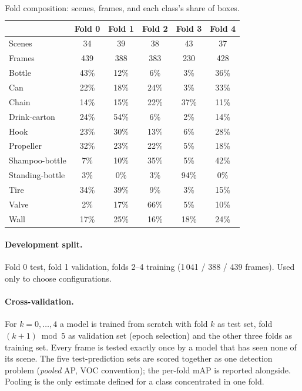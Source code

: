 \documentclass[11pt,a4paper]{article}
\begin{document}
\begin{table}[H]
  \centering
  \small
  \caption{Fold composition: scenes, frames, and each class's share of boxes.}
  \label{tab:folds}
  \begin{tabular}{lccccc}
    \toprule
    & Fold 0 & Fold 1 & Fold 2 & Fold 3 & Fold 4 \\
    \midrule
    Scenes & 34 & 39 & 38 & 43 & 37 \\
    Frames & 439 & 388 & 383 & 230 & 428 \\
    \midrule
    Bottle & 43\% & 12\% & 6\% & 3\% & 36\% \\
    Can & 22\% & 18\% & 24\% & 3\% & 33\% \\
    Chain & 14\% & 15\% & 22\% & 37\% & 11\% \\
    Drink-carton & 24\% & 54\% & 6\% & 2\% & 14\% \\
    Hook & 23\% & 30\% & 13\% & 6\% & 28\% \\
    Propeller & 32\% & 23\% & 22\% & 5\% & 18\% \\
    Shampoo-bottle & 7\% & 10\% & 35\% & 5\% & 42\% \\
    Standing-bottle & 3\% & 0\% & 3\% & 94\% & 0\% \\
    Tire & 34\% & 39\% & 9\% & 3\% & 15\% \\
    Valve & 2\% & 17\% & 66\% & 5\% & 10\% \\
    Wall & 17\% & 25\% & 16\% & 18\% & 24\% \\
    \bottomrule
  \end{tabular}
\end{table}

\paragraph{Development split.} Fold 0 test, fold 1 validation, folds 2--4
training (1\,041 / 388 / 439 frames). Used only to choose configurations.

\paragraph{Cross-validation.} For $k = 0, \dots, 4$ a model is trained from
scratch with fold $k$ as test set, fold $(k+1) \bmod 5$ as validation set
(epoch selection) and the other three folds as training set. Every frame is
tested exactly once by a model that has seen none of its scene. The five
test-prediction sets are scored together as one detection problem
(\emph{pooled} AP, VOC convention); the per-fold mAP is reported alongside.
Pooling is the only estimate defined for a class concentrated in one fold.
\end{document}
